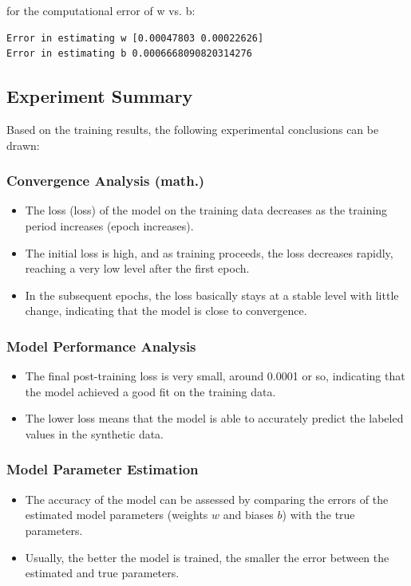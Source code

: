 \documentclass[a4paper,12pt]{article}
\begin{document}
for the computational error of w vs. b:
\begin{lstlisting}
Error in estimating w [0.00047803 0.00022626]
Error in estimating b 0.0006668090820314276
\end{lstlisting}
\subsection{Experiment Summary}
Based on the training results, the following experimental conclusions can be drawn:

\subsubsection{Convergence Analysis (math.)}
\begin{itemize}
  \item The loss (loss) of the model on the training data decreases as the training period increases (epoch increases).
  \item The initial loss is high, and as training proceeds, the loss decreases rapidly, reaching a very low level after the first epoch.
  \item In the subsequent epochs, the loss basically stays at a stable level with little change, indicating that the model is close to convergence.
\end{itemize}

\subsubsection{Model Performance Analysis}
\begin{itemize}
\item The final post-training loss is very small, around 0.0001 or so, indicating that the model achieved a good fit on the training data.
\item The lower loss means that the model is able to accurately predict the labeled values in the synthetic data.
\end{itemize}

\subsubsection{Model Parameter Estimation}
\begin{itemize}
  \item The accuracy of the model can be assessed by comparing the errors of the estimated model parameters (weights \( w \) and biases \( b \)) with the true parameters.
  \item Usually, the better the model is trained, the smaller the error between the estimated and true parameters.
\end{itemize}
\end{document}
